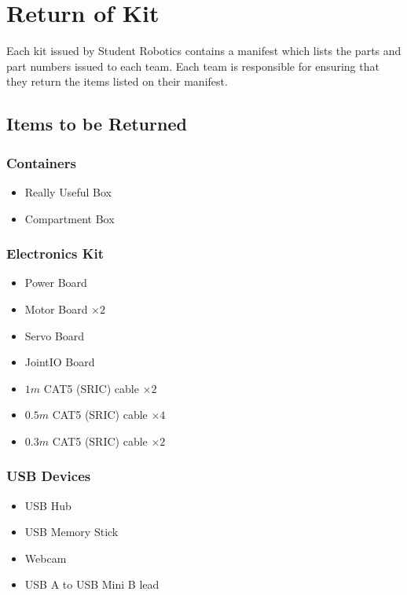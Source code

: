 \section {Return of Kit}
\label{sec:kit-return}

Each kit issued by Student Robotics contains a manifest which lists the parts and part numbers issued to each team.
Each team is responsible for ensuring that they return the items listed on their manifest.

\subsection {Items to be Returned}

\subsubsection {Containers}

\begin{itemize}
 \item Really Useful Box
 \item Compartment Box
\end{itemize}

\subsubsection {Electronics Kit}

\begin{itemize}
 \item Power Board
 \item Motor Board $\times 2$
 \item Servo Board
 \item JointIO Board
 \item $  1m$ CAT5 (SRIC) cable $\times 2$
 \item $0.5m$ CAT5 (SRIC) cable $\times 4$
 \item $0.3m$ CAT5 (SRIC) cable $\times 2$
\end{itemize}

\subsubsection {USB Devices}

\begin{itemize}
 \item USB Hub
 \item USB Memory Stick
 \item Webcam
 \item USB A to USB Mini B lead
\end{itemize}

